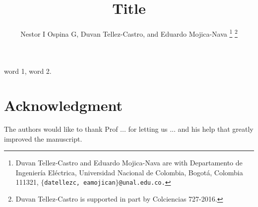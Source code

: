 \documentclass[letterpaper,10pt,conference,draftcls,onecolumn]{ieeeconf} %
\theoremstyle{plain}
\begin{document}
\title{\LARGE \bf  Title}

\author{Nestor I Ospina G, Duvan Tellez-Castro,
        and Eduardo Mojica-Nava
\thanks{Duvan Tellez-Castro and Eduardo Mojica-Nava are with Departamento de Ingenier\'ia El\'ectrica, Universidad Nacional de Colombia, Bogot\'a, Colombia 111321, $\{$\texttt{datellezc, eamojican$\}$@unal.edu.co.}}        
\thanks{Duvan Tellez-Castro is supported in part by Colciencias 727-2016.}
}        
 
\maketitle

\begin{abstract}

 
 
\end{abstract}
\begin{keywords}
	word 1, word 2. %
\end{keywords}



 
 
 
\section*{Acknowledgment}
The authors would like to thank Prof ... for  letting us ... and his help that greatly improved the manuscript.
%
\end{document}
